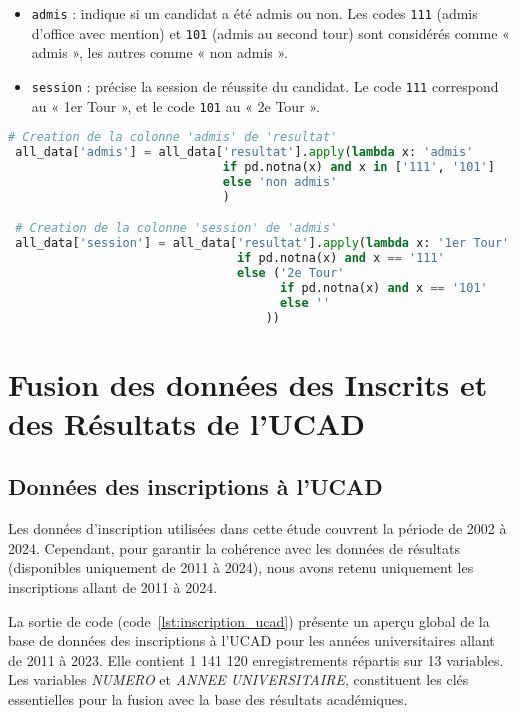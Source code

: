 \begin{itemize}
    \item \texttt{admis} : indique si un candidat a été admis ou non. Les codes \texttt{111} (admis d’office avec mention) et \texttt{101} (admis au second tour) sont considérés comme « admis », les autres comme « non admis ».
    \item \texttt{session} : précise la session de réussite du candidat. Le code \texttt{111} correspond au « 1er Tour », et le code \texttt{101} au « 2e Tour ».
\end{itemize}

\begin{lstlisting}[language=Python,
    caption=Création de nouvelles colonnes,
    label=lst:creation_colonnes,
    basicstyle=\ttfamily\small,
    backgroundcolor=\color{gray!10}
]
 # Creation de la colonne 'admis' de 'resultat'
 all_data['admis'] = all_data['resultat'].apply(lambda x: 'admis' 
                              if pd.notna(x) and x in ['111', '101'] 
                              else 'non admis'
                              )

 # Creation de la colonne 'session' de 'admis'
 all_data['session'] = all_data['resultat'].apply(lambda x: '1er Tour' 
                                if pd.notna(x) and x == '111' 
                                else ('2e Tour' 
                                      if pd.notna(x) and x == '101' 
                                      else ''
                                    ))
\end{lstlisting}

\section{Fusion des données des Inscrits et des Résultats de l’UCAD}

\subsection{Données des inscriptions à l’UCAD}

Les données d’inscription utilisées dans cette étude couvrent la période de 2002 à 2024. 
Cependant, pour garantir la cohérence avec les données de résultats (disponibles uniquement de 2011 à 2024), 
nous avons retenu uniquement les inscriptions allant de 2011 à 2024.

La sortie de code (code~\ref{lst:inscription_ucad}) présente un aperçu global de la base de données des inscriptions à l’UCAD pour les années universitaires allant de 2011 à 2023. 
Elle contient 1 141 120 enregistrements répartis sur 13 variables. 
Les variables \textit{NUMERO} et \textit{ANNEE UNIVERSITAIRE}, constituent les clés essentielles pour la fusion avec la base des résultats académiques.

